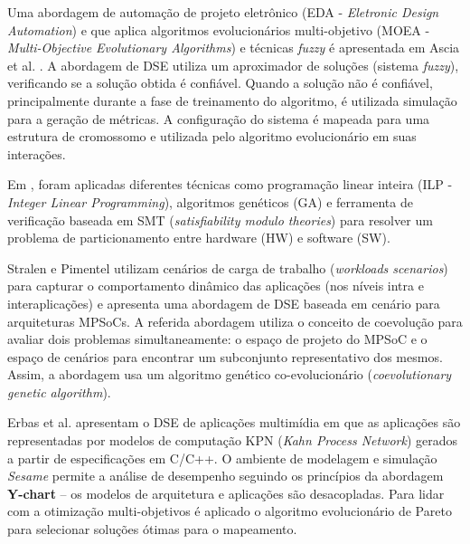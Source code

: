 \documentclass[tese-proposta,nocipinfo]{texufpel}
\begin{document}
Uma abordagem de automação de projeto eletrônico (EDA - \textit{Eletronic Design Automation}) e que aplica algoritmos evolucionários multi-objetivo (MOEA - \textit{Multi-Objective Evolutionary Algorithms}) e técnicas \textit{fuzzy} é apresentada em Ascia et al. \cite{Ascia2011382}. A abordagem de DSE utiliza um aproximador de soluções (sistema \textit{fuzzy}), verificando se a solução obtida é confiável. Quando a solução não é confiável, principalmente durante a fase de treinamento do algoritmo, é utilizada simulação para a geração de métricas. A configuração do sistema é mapeada para uma estrutura de cromossomo e utilizada pelo algoritmo evolucionário em suas interações.

Em \cite{Trindade2016}, foram aplicadas diferentes técnicas como programação linear inteira (ILP - \textit{Integer Linear Programming}), algoritmos genéticos (GA) e ferramenta de verificação baseada em SMT (\textit{satisfiability modulo theories}) para resolver um problema de particionamento entre hardware (HW) e software (SW).

Stralen e Pimentel \cite{van2010scenario} utilizam cenários de carga de trabalho (\textit{workloads scenarios}) para capturar o comportamento dinâmico das aplicações (nos níveis intra e interaplicações) e apresenta uma abordagem de DSE baseada em cenário para arquiteturas MPSoCs. A referida abordagem utiliza o conceito de coevolução para avaliar dois problemas simultaneamente: o espaço de projeto do MPSoC e o espaço de cenários para encontrar um subconjunto representativo dos mesmos. Assim, a abordagem usa um algoritmo genético co-evolucionário (\textit{coevolutionary genetic algorithm}).%

Erbas et al. \cite{erbas2007framework} apresentam o DSE de aplicações multimídia em que as aplicações são representadas por modelos de computação KPN (\textit{Kahn Process Network}) gerados a partir de especificações em C/C++. O ambiente de modelagem e simulação \textit{Sesame} permite a análise de desempenho seguindo os princípios da abordagem \textbf{Y-chart} -- os modelos de arquitetura e aplicações são desacopladas. Para lidar com a otimização multi-objetivos é aplicado o algoritmo evolucionário de Pareto para selecionar soluções ótimas para o mapeamento.
\end{document}
